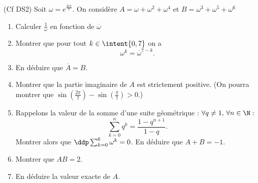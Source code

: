\documentclass[a4paper, 11pt,reqno]{article}
\begin{document}
\begin{exercice} (Cf DS2) 
Soit $\omega =e^{\frac{2i\pi}{7}}$. On considère $A=\omega+\omega^2 +\omega^4$ et $B =\omega^3+\omega^5 +\omega^6$

\begin{enumerate}
\item Calculer $\frac{1}{\omega}$ en fonction de $\overline{\omega}$
\item Montrer que pour tout $k\in \intent{0,7}$ on a 
$$\omega^k =\overline{\omega}^{7-k}.$$
\item En déduire que $\overline{A}=B$.
\item Montrer que la partie imaginaire de $A$ est strictement positive. (On pourra montrer que $\sin\left( \frac{2\pi}{7}\right)-\sin\left( \frac{\pi}{7}\right)>0$.)
\item  Rappelons la valeur de la  somme d'une suite géométrique : $\forall q\neq 1, \, \forall n\in \N : $
$$\sum_{k=0}^n q^k =\frac{1-q^{n+1}}{1-q}.$$
Montrer alors que $\ddp \sum_{k=0}^6 \omega^k =0$. En déduire que $A+B=-1$.
\item Montrer que $AB=2$. 

\item En déduire la valeur exacte de $A$.


\end{enumerate}
\end{exercice}
\end{document}
